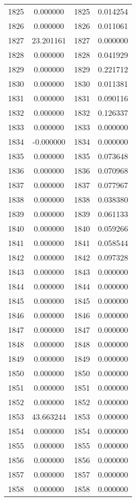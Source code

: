 \documentclass[12pt]{article}
\begin{document}
\begin{longtable}{@{}cccc@{}}
1825 & 0.000000 & 1825 & 0.014254 \\
1826 & 0.000000 & 1826 & 0.011061 \\
1827 & 23.201161 & 1827 & 0.000000 \\
1828 & 0.000000 & 1828 & 0.041929 \\
1829 & 0.000000 & 1829 & 0.221712 \\
1830 & 0.000000 & 1830 & 0.011381 \\
1831 & 0.000000 & 1831 & 0.090116 \\
1832 & 0.000000 & 1832 & 0.126337 \\
1833 & 0.000000 & 1833 & 0.000000 \\
1834 & -0.000000 & 1834 & 0.000000 \\
1835 & 0.000000 & 1835 & 0.073648 \\
1836 & 0.000000 & 1836 & 0.070968 \\
1837 & 0.000000 & 1837 & 0.077967 \\
1838 & 0.000000 & 1838 & 0.038380 \\
1839 & 0.000000 & 1839 & 0.061133 \\
1840 & 0.000000 & 1840 & 0.059266 \\
1841 & 0.000000 & 1841 & 0.058544 \\
1842 & 0.000000 & 1842 & 0.097328 \\
1843 & 0.000000 & 1843 & 0.000000 \\
1844 & 0.000000 & 1844 & 0.000000 \\
1845 & 0.000000 & 1845 & 0.000000 \\
1846 & 0.000000 & 1846 & 0.000000 \\
1847 & 0.000000 & 1847 & 0.000000 \\
1848 & 0.000000 & 1848 & 0.000000 \\
1849 & 0.000000 & 1849 & 0.000000 \\
1850 & 0.000000 & 1850 & 0.000000 \\
1851 & 0.000000 & 1851 & 0.000000 \\
1852 & 0.000000 & 1852 & 0.000000 \\
1853 & 43.663244 & 1853 & 0.000000 \\
1854 & 0.000000 & 1854 & 0.000000 \\
1855 & 0.000000 & 1855 & 0.000000 \\
1856 & 0.000000 & 1856 & 0.000000 \\
1857 & 0.000000 & 1857 & 0.000000 \\
1858 & 0.000000 & 1858 & 0.000000 \\

\end{longtable}
\end{document}
